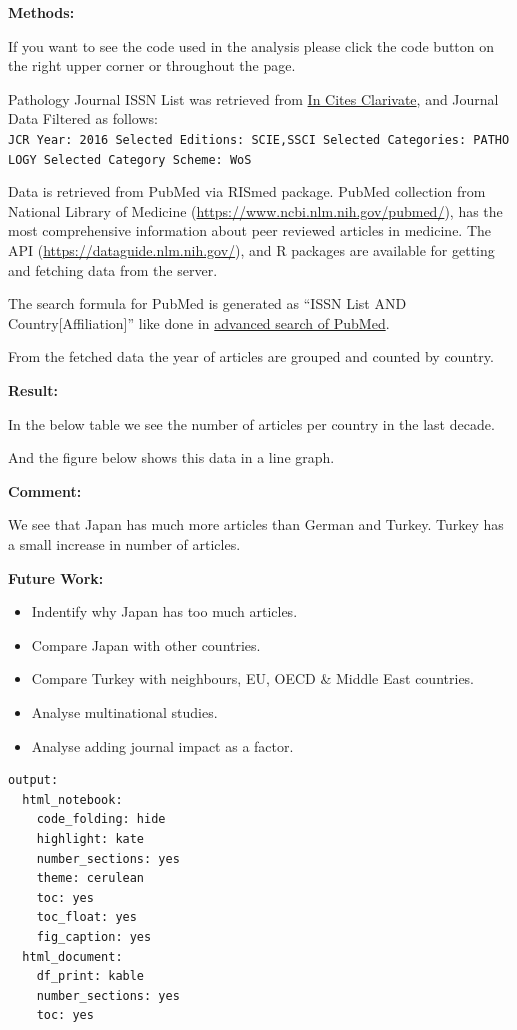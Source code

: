 \documentclass[
]{book}
\providecommand{\tightlist}{%
  \setlength{\itemsep}{0pt}\setlength{\parskip}{0pt}}
\begin{document}
\textbf{Methods:}

If you want to see the code used in the analysis please click the code button on the right upper corner or throughout the page.

Pathology Journal ISSN List was retrieved from \href{https://jcr.incites.thomsonreuters.com/}{In Cites Clarivate}, and Journal Data Filtered as follows: \texttt{JCR\ Year:\ 2016\ Selected\ Editions:\ SCIE,SSCI\ Selected\ Categories:\ \textquotesingle{}PATHOLOGY\textquotesingle{}\ Selected\ Category\ Scheme:\ WoS}

Data is retrieved from PubMed via RISmed package.
PubMed collection from National Library of Medicine (\url{https://www.ncbi.nlm.nih.gov/pubmed/}), has the most comprehensive information about peer reviewed articles in medicine.
The API (\url{https://dataguide.nlm.nih.gov/}), and R packages are available for getting and fetching data from the server.

The search formula for PubMed is generated as ``ISSN List AND Country{[}Affiliation{]}'' like done in \href{https://www.ncbi.nlm.nih.gov/pubmed/advanced}{advanced search of PubMed}.

From the fetched data the year of articles are grouped and counted by country.

\textbf{Result:}

In the below table we see the number of articles per country in the last decade.

And the figure below shows this data in a line graph.

\textbf{Comment:}

We see that Japan has much more articles than German and Turkey.
Turkey has a small increase in number of articles.

\textbf{Future Work:}

\begin{itemize}
\tightlist
\item
  Indentify why Japan has too much articles.
\item
  Compare Japan with other countries.
\item
  Compare Turkey with neighbours, EU, OECD \& Middle East countries.
\item
  Analyse multinational studies.
\item
  Analyse adding journal impact as a factor.
\end{itemize}

\begin{verbatim}
output: 
  html_notebook: 
    code_folding: hide
    highlight: kate
    number_sections: yes
    theme: cerulean
    toc: yes
    toc_float: yes
    fig_caption: yes
  html_document: 
    df_print: kable
    number_sections: yes
    toc: yes
\end{verbatim}
\end{document}

